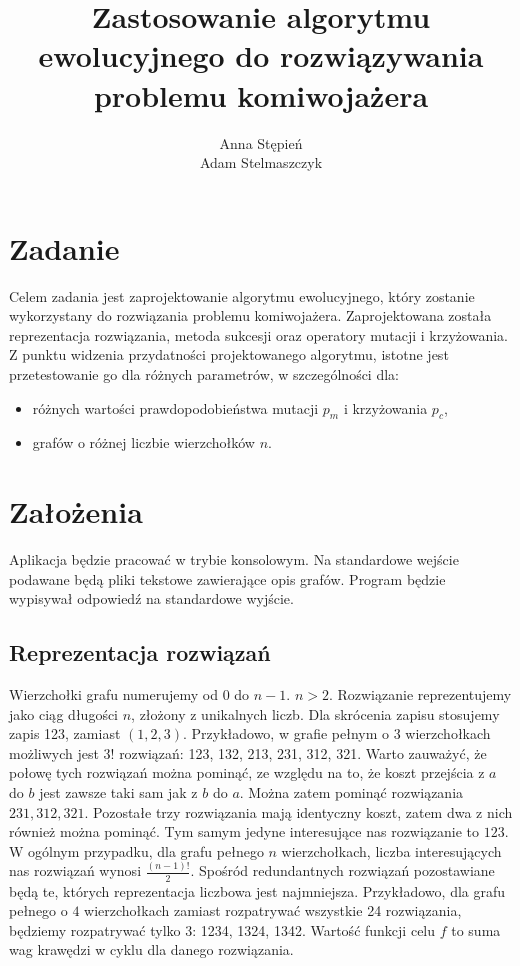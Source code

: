 \documentclass[12pt, a4paper]{article}
\title{\textbf{Zastosowanie algorytmu ewolucyjnego do rozwiązywania problemu komiwojażera}}
\author{Anna Stępień \\ Adam Stelmaszczyk}
\date{}
\begin{document}
\maketitle

\section{Zadanie}
Celem zadania jest zaprojektowanie algorytmu ewolucyjnego, który zostanie wykorzystany do rozwiązania problemu komiwojażera.
Zaprojektowana została reprezentacja rozwiązania, metoda sukcesji oraz operatory mutacji i krzyżowania. 
Z punktu widzenia przydatności projektowanego algorytmu, istotne jest przetestowanie go dla różnych parametrów, w szczególności dla:
\begin{itemize}
	\item różnych wartości prawdopodobieństwa mutacji $p_m$ i krzyżowania $p_c$,
	\item grafów o różnej liczbie wierzchołków $n$.
\end{itemize}

\section{Założenia}
Aplikacja będzie pracować w trybie konsolowym. Na standardowe wejście podawane będą pliki tekstowe zawierające opis grafów.
Program będzie wypisywał odpowiedź na standardowe wyjście.

\subsection{Reprezentacja rozwiązań}

Wierzchołki grafu numerujemy od 0 do $n - 1$. $n > 2$. Rozwiązanie reprezentujemy jako ciąg długości $n$, złożony z unikalnych liczb. 
Dla skrócenia zapisu stosujemy zapis 123, zamiast $(1,2,3)$. Przykładowo, w grafie pełnym o 3 wierzchołkach możliwych jest $3!$ rozwiązań: 123, 132, 213, 231, 312, 321.
Warto zauważyć, że połowę tych rozwiązań można pominąć, ze względu na to, że koszt przejścia z $a$ do $b$ jest zawsze 
taki sam jak z $b$ do $a$. Można zatem pominąć rozwiązania $231, 312, 321$. Pozostałe trzy rozwiązania mają identyczny koszt,
zatem dwa z nich również można pominąć. Tym samym jedyne interesujące nas rozwiązanie to $123$.
W ogólnym przypadku, dla grafu pełnego $n$ wierzchołkach, liczba interesujących nas rozwiązań wynosi $\frac{(n-1)!}{2}$. Spośród redundantnych rozwiązań pozostawiane będą te,
których reprezentacja liczbowa jest najmniejsza. Przykładowo, dla grafu pełnego o $4$ wierzchołkach zamiast rozpatrywać wszystkie
24 rozwiązania, będziemy rozpatrywać tylko 3: 1234, 1324, 1342. 
Wartość funkcji celu $f$ to suma wag krawędzi w cyklu dla danego rozwiązania.
\end{document}
